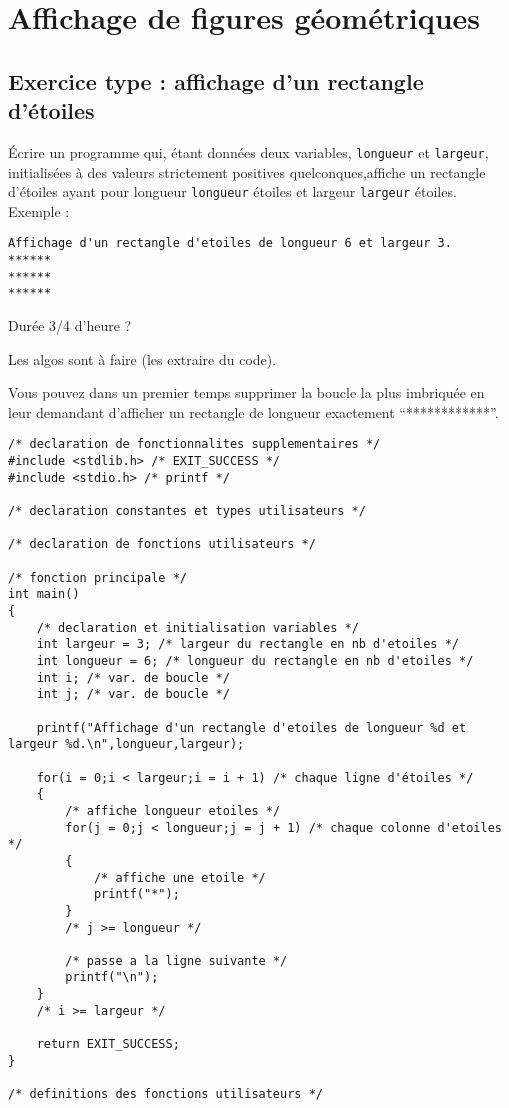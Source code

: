 % 

\section{Affichage de figures géométriques}


\subsection{Exercice type : affichage d'un rectangle d'étoiles}

Écrire un programme qui, étant données deux variables,
\verb|longueur| et \verb|largeur|, initialisées à des valeurs
strictement positives quelconques,affiche  un rectangle d'étoiles ayant pour
longueur \verb|longueur| étoiles et largeur \verb|largeur|
étoiles. Exemple :
\begin{verbatim}
Affichage d'un rectangle d'etoiles de longueur 6 et largeur 3.
******
******
******
\end{verbatim}

\begin{correction}
Durée 3/4 d'heure ?

Les algos sont à faire (les extraire du code).

Vous pouvez dans un premier temps supprimer la boucle la plus imbriquée en leur demandant d'afficher un rectangle de longueur exactement ``************''.

\begin{verbatim}
/* declaration de fonctionnalites supplementaires */
#include <stdlib.h> /* EXIT_SUCCESS */
#include <stdio.h> /* printf */

/* declaration constantes et types utilisateurs */

/* declaration de fonctions utilisateurs */

/* fonction principale */
int main()
{
    /* declaration et initialisation variables */
    int largeur = 3; /* largeur du rectangle en nb d'etoiles */
    int longueur = 6; /* longueur du rectangle en nb d'etoiles */
    int i; /* var. de boucle */
    int j; /* var. de boucle */

    printf("Affichage d'un rectangle d'etoiles de longueur %d et largeur %d.\n",longueur,largeur);

    for(i = 0;i < largeur;i = i + 1) /* chaque ligne d'étoiles */
    {
        /* affiche longueur etoiles */
        for(j = 0;j < longueur;j = j + 1) /* chaque colonne d'etoiles */
        {
            /* affiche une etoile */
            printf("*");
        }
        /* j >= longueur */

        /* passe a la ligne suivante */
        printf("\n");
    }
    /* i >= largeur */

    return EXIT_SUCCESS;
}

/* definitions des fonctions utilisateurs */
\end{verbatim}
\end{correction}

